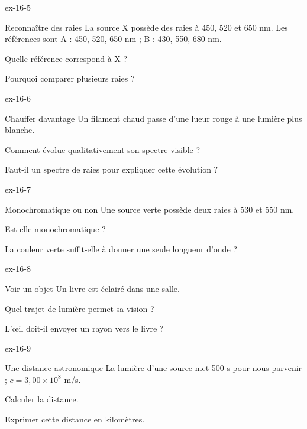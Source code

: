 \begin{blocLivre}{ex-16-5}\begin{exercice}[2]{Reconnaître des raies}
La source X possède des raies à 450, 520 et 650 nm. Les références sont A : 450, 520, 650 nm ; B : 430, 550, 680 nm.
\begin{questions}
\item Quelle référence correspond à X ?
\item Pourquoi comparer plusieurs raies ?
\end{questions}
\end{exercice}\end{blocLivre}
\begin{blocLivre}{ex-16-6}\begin{exercice}[2]{Chauffer davantage}
Un filament chaud passe d’une lueur rouge à une lumière plus blanche.
\begin{questions}
\item Comment évolue qualitativement son spectre visible ?
\item Faut-il un spectre de raies pour expliquer cette évolution ?
\end{questions}
\end{exercice}\end{blocLivre}
\begin{blocLivre}{ex-16-7}\begin{exercice}[2]{Monochromatique ou non}
Une source verte possède deux raies à 530 et 550 nm.
\begin{questions}
\item Est-elle monochromatique ?
\item La couleur verte suffit-elle à donner une seule longueur d’onde ?
\end{questions}
\end{exercice}\end{blocLivre}
\begin{blocLivre}{ex-16-8}\begin{exercice}[2]{Voir un objet}
Un livre est éclairé dans une salle.
\begin{questions}
\item Quel trajet de lumière permet sa vision ?
\item L’œil doit-il envoyer un rayon vers le livre ?
\end{questions}
\end{exercice}\end{blocLivre}
\begin{blocLivre}{ex-16-9}\begin{exercice}[3]{Une distance astronomique}
La lumière d’une source met 500 s pour nous parvenir ; $c=3,00\times10^8$ m/s.
\begin{questions}
\item Calculer la distance.
\item Exprimer cette distance en kilomètres.
\end{questions}
\end{exercice}\end{blocLivre}
